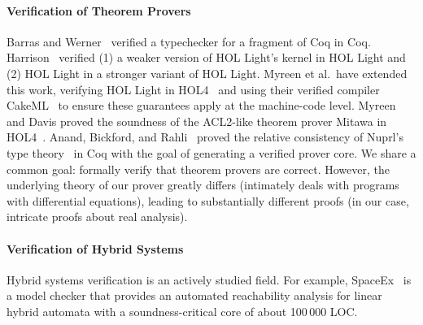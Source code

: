 \documentclass[12pt]{cmuthesis}
\theoremstyle{definition}
\theoremstyle{remark}
\begin{document}
\paragraph{Verification of Theorem Provers}
%
Barras and Werner~\cite{Barras:1997} verified a typechecker for a fragment of Coq in Coq.
Harrison~\cite{Harrison:2006} verified (1) a weaker version of HOL Light's kernel in HOL Light and (2) HOL Light in a stronger variant of HOL Light.
Myreen et al.\ have extended this work, verifying HOL Light in HOL4~\cite{Myreen+Owens+Kumar:2013,Kumar+Arthan+Myreen+Owens:jar:2016} and using their verified compiler CakeML~\cite{Kumar+Myreen+Norrish+Owens:2014} to ensure these guarantees apply at the machine-code level.
Myreen and Davis proved the soundness of the ACL2-like theorem prover Mitawa in HOL4~\cite{Myreen+Davis:itp:2014}.
Anand, Bickford, and Rahli~\cite{Anand+Rahli:2014,Rahli+Bickford:cpp:2016}
proved the relative consistency of Nuprl's type theory~\cite{Constable+al:1986,Allen+al:2006} in Coq with the goal of generating a verified prover core.
%
We share a common goal:
formally verify that theorem provers are correct.
%
However, the underlying theory of our prover greatly differs (\dL intimately deals with programs with differential equations), leading to substantially different proofs (in our case, intricate proofs about real analysis).

\paragraph{Verification of Hybrid Systems}
%
Hybrid systems verification is an actively studied field.
For example, SpaceEx~\cite{Frehse+al:cav:2011} is a model checker that
provides an automated reachability analysis for linear hybrid
automata with a soundness-critical core of about 100\,000 LOC.
\end{document}
